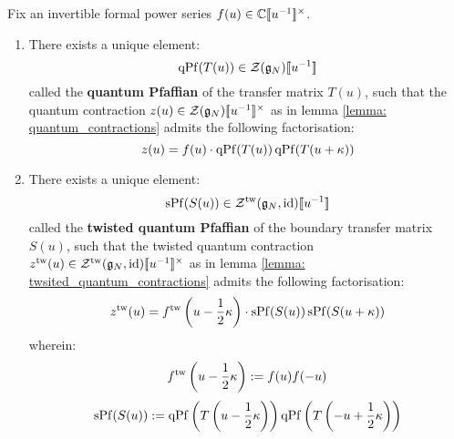             \begin{lemma} \label{lemma: (twsited)_quantum_pfaffians}
                Fix an invertible formal power series $f(u) \in \bbC[\![u^{-1}]\!]^{\x}$.
                \begin{enumerate}
                    \item There exists a unique element:
                        $$\operatorname{qPf}( T(u) ) \in \mathcal{Z}(\mathfrak{g}_N)[\![u^{-1}]\!]$$
                    called the \textbf{quantum Pfaffian} of the transfer matrix $T(u)$, such that the quantum contraction $z(u) \in \calZ(\g_N)[\![u^{-1}]\!]^{\x}$ as in lemma \ref{lemma: quantum_contractions} admits the following factorisation:
                        \begin{equation} \label{equation: quantum_pfaffians}
                            z(u) = f(u) \cdot \operatorname{qPf}( T(u) ) \operatorname{qPf}( T(u + \kappa) )
                        \end{equation}
                    \item There exists a unique element:
                        $$\operatorname{sPf}( S(u) ) \in \mathcal{Z}^{\mathrm{tw}}(\mathfrak{g}_N, \mathrm{id})[\![u^{-1}]\!]$$
                    called the \textbf{twisted quantum Pfaffian} of the boundary transfer matrix $S(u)$, such that the twisted quantum contraction $z^{\tw}(u) \in \calZ^{\tw}(\g_N, \id)[\![u^{-1}]\!]^{\x}$ as in lemma \ref{lemma: twsited_quantum_contractions} admits the following factorisation:
                        \begin{equation} \label{equation: twisted_quantum_pfaffians}
                            z^{\mathrm{tw}}(u) = f^{\mathrm{tw}}\left( u - \frac12 \kappa \right) \cdot \operatorname{sPf}( S(u) ) \operatorname{sPf}( S(u + \kappa) )
                        \end{equation}
                    wherein:
                        $$f^{\mathrm{tw}}\left( u - \frac12 \kappa \right) := f(u) f(-u)$$
                        $$\operatorname{sPf}( S(u) ) := \operatorname{qPf}\left( T\left( u - \frac12 \kappa \right) \right) \operatorname{qPf}\left( T\left( -u + \frac12 \kappa \right) \right)$$
                \end{enumerate}
            \end{lemma}
